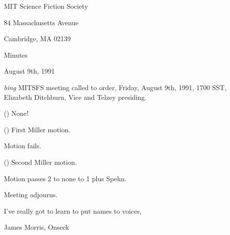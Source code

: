 \setlength{\topmargin}{-0.5in}
\setlength{\oddsidemargin}{0.0in}
\setlength{\evensidemargin}{0.0in}
\setlength{\textheight}{9in}
\setlength{\textwidth}{6.5in}



\begin{center}
MIT Science Fiction Society

84 Massachusetts Avenue

Cambridge, MA 02139

\vspace{0.2in}
Minutes

August 9th, 1991

\end{center}

\vspace{0.15in}
{\em bing\/}  MITSFS meeting called to order, Friday, August 9th, 1991,
1700 SST, Elizabeth Ditchburn, Vice and Telzey presiding.

() None!

() First Miller motion.

Motion fails.

() Second Miller motion.

Motion passes 2 to none to 1 plus Spehn.

Meeting adjourns.

\vspace{0.15in}
\begin{center}
I've really got to learn to put names to voices,

James Morris, Onseck
\end{center}

